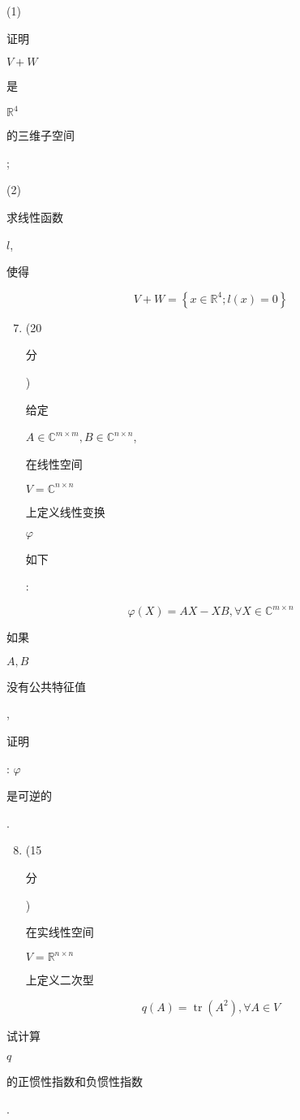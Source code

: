 \documentclass[10pt]{article}
\begin{document}
(1) \begin{CJK}{UTF8}{mj}证明\end{CJK} $V+W$ \begin{CJK}{UTF8}{mj}是\end{CJK} $\mathbb{R}^{4}$ \begin{CJK}{UTF8}{mj}的三维子空间\end{CJK};

(2) \begin{CJK}{UTF8}{mj}求线性函数\end{CJK} $l$, \begin{CJK}{UTF8}{mj}使得\end{CJK}
$$
V+W=\left\{x \in \mathbb{R}^{4} ; l(x)=0\right\}
$$

\begin{enumerate}
  \setcounter{enumi}{6}
  \item (20 \begin{CJK}{UTF8}{mj}分\end{CJK}) \begin{CJK}{UTF8}{mj}给定\end{CJK} $A \in \mathbb{C}^{m \times m}, B \in \mathbb{C}^{n \times n}$, \begin{CJK}{UTF8}{mj}在线性空间\end{CJK} $V=\mathbb{C}^{n \times n}$ \begin{CJK}{UTF8}{mj}上定义线性变换\end{CJK} $\varphi$ \begin{CJK}{UTF8}{mj}如下\end{CJK}:
\end{enumerate}
$$
\varphi(X)=A X-X B, \forall X \in \mathbb{C}^{m \times n}
$$
\begin{CJK}{UTF8}{mj}如果\end{CJK} $A, B$ \begin{CJK}{UTF8}{mj}没有公共特征值\end{CJK}, \begin{CJK}{UTF8}{mj}证明\end{CJK}: $\varphi$ \begin{CJK}{UTF8}{mj}是可逆的\end{CJK}.

\begin{enumerate}
  \setcounter{enumi}{7}
  \item (15 \begin{CJK}{UTF8}{mj}分\end{CJK}) \begin{CJK}{UTF8}{mj}在实线性空间\end{CJK} $V=\mathbb{R}^{n \times n}$ \begin{CJK}{UTF8}{mj}上定义二次型\end{CJK}
\end{enumerate}
$$
q(A)=\operatorname{tr}\left(A^{2}\right), \forall A \in V
$$
\begin{CJK}{UTF8}{mj}试计算\end{CJK} $q$ \begin{CJK}{UTF8}{mj}的正惯性指数和负惯性指数\end{CJK}.
\end{document}
